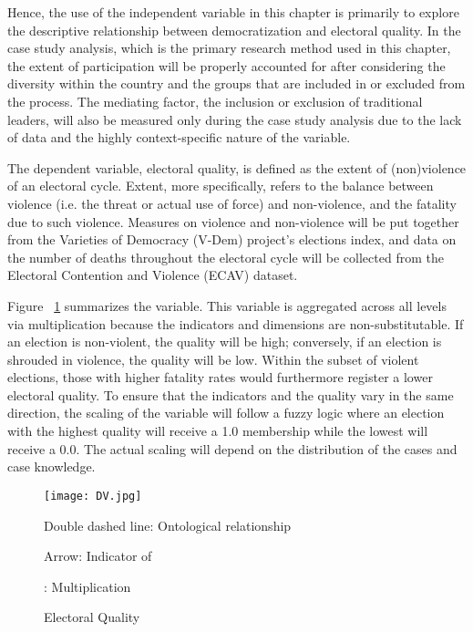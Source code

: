 \documentclass [11pt]{article}
\begin{document}
Hence, the use of the independent variable in this chapter is primarily to explore the descriptive relationship between democratization and electoral quality. In the case study analysis, which is the primary research method used in this chapter, the extent of participation will be properly accounted for after considering the diversity within the country and the groups that are included in or excluded from the process. The mediating factor, the inclusion or exclusion of traditional leaders, will also be measured only during the case study analysis due to the lack of data and the highly context-specific nature of the variable.

The dependent variable, electoral quality, is defined as the extent of (non)violence of an electoral cycle. Extent, more specifically, refers to the balance between violence (i.e. the threat or actual use of force) and non-violence, and the fatality due to such violence. Measures on violence and non-violence will be put together from the Varieties of Democracy (V-Dem) project's elections index, and data on the number of deaths throughout the electoral cycle will be collected from the Electoral Contention and Violence (ECAV) dataset.

Figure ~\ref{fig2} summarizes the variable. This variable is aggregated across all levels via multiplication because the indicators and dimensions are non-substitutable. If an election is non-violent, the quality will be high; conversely, if an election is shrouded in violence, the quality will be low. Within the subset of violent elections, those with higher fatality rates would furthermore register a lower electoral quality. To ensure that the indicators and the quality vary in the same direction, the scaling of the variable will follow a fuzzy logic where an election with the highest quality will receive a 1.0 membership while the lowest will receive a 0.0. The actual scaling will depend on the distribution of the cases and case knowledge.

\begin{figure} [h!]

\caption{Electoral Quality}
\label{fig2}%
\begin{center} 
\small
\texttt{[image: DV.jpg]}

{\footnotesize Double dashed line: Ontological relationship}

{\footnotesize Arrow: Indicator of}

{\footnotesize * : Multiplication}
 
\end{center}
\end{figure}
\end{document}
